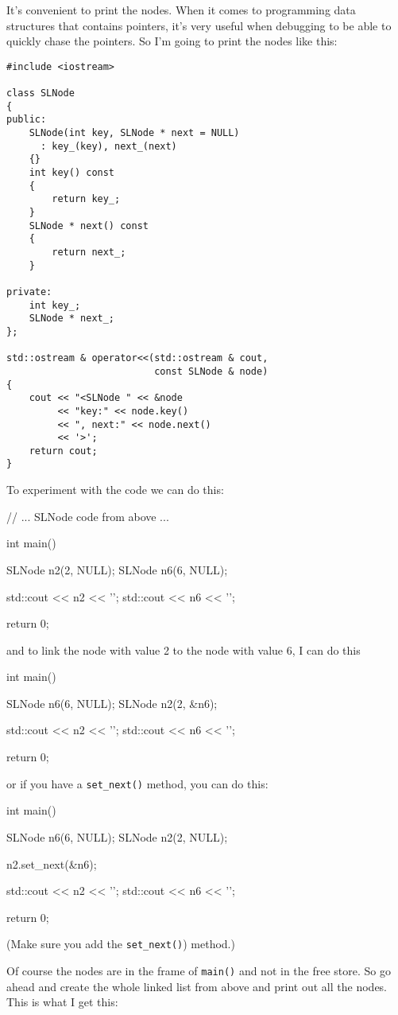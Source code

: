 It's convenient to print the nodes.
When it comes to programming data structures that contains
pointers,
it's very useful when debugging to be able to quickly
chase the pointers.
So I'm going to print the nodes like this:
\begin{Verbatim}[frame=single,fontsize=\footnotesize]
#include <iostream>

class SLNode
{
public:
    SLNode(int key, SLNode * next = NULL)
      : key_(key), next_(next)
    {}
    int key() const
    {
        return key_;
    }
    SLNode * next() const
    {
        return next_;
    }
    
private:
    int key_;
    SLNode * next_;
};

std::ostream & operator<<(std::ostream & cout,
                          const SLNode & node)
{
    cout << "<SLNode " << &node
         << "key:" << node.key()
         << ", next:" << node.next()
         << '>';
    return cout;
}
\end{Verbatim}

To experiment with the code we can do this:
\begin{console}[fontsize=\footnotesize]
// ... SLNode code from above ...

int main()
{
    SLNode n2(2, NULL);
    SLNode n6(6, NULL);

    std::cout << n2 << '\n';
    std::cout << n6 << '\n';
    
    return 0;
}
\end{console}
and to link the node with value 2 to the node with value 6, I can do this
\begin{console}[fontsize=\footnotesize]
int main()
{
    SLNode n6(6, NULL);
    SLNode n2(2, &n6);

    std::cout << n2 << '\n';
    std::cout << n6 << '\n';
    
    return 0;
}
\end{console}
or if you have a \verb!set_next()! method, you can do this:
\begin{console}[fontsize=\footnotesize]
int main()
{
    SLNode n6(6, NULL);
    SLNode n2(2, NULL);

    n2.set_next(&n6);

    std::cout << n2 << '\n';
    std::cout << n6 << '\n';
    
    return 0;
}
\end{console}

(Make sure you add the \verb!set_next()!) method.)

Of course the nodes are in the frame of \verb!main()! and
not in the free store.
So go ahead and create the whole linked list from above
and print out all the nodes.
This is what I get this:


